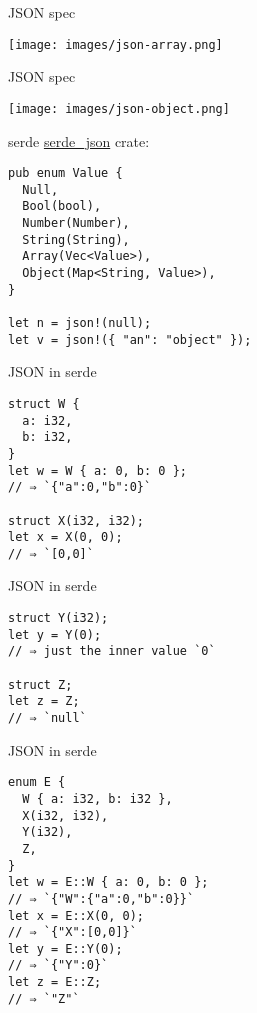 \documentclass{beamer}
\begin{document}
\begin{frame}[fragile]{JSON spec}
  \begin{center}
    \texttt{[image: images/json-array.png]}
  \end{center}
\end{frame}

\begin{frame}[fragile]{JSON spec}
  \begin{center}
    \texttt{[image: images/json-object.png]}
  \end{center}
\end{frame}

\begin{frame}[fragile]{serde}
  \href{https://github.com/serde-rs/json}{serde\_json} crate:
  \begin{verbatim}
pub enum Value {
  Null,
  Bool(bool),
  Number(Number),
  String(String),
  Array(Vec<Value>),
  Object(Map<String, Value>),
}

let n = json!(null);
let v = json!({ "an": "object" });
  \end{verbatim}
\end{frame}


\begin{frame}[fragile]{JSON in serde}
  \begin{verbatim}
struct W {
  a: i32,
  b: i32,
}
let w = W { a: 0, b: 0 };
// ⇒ `{"a":0,"b":0}`

struct X(i32, i32);
let x = X(0, 0);
// ⇒ `[0,0]`
  \end{verbatim}
\end{frame}

\begin{frame}[fragile]{JSON in serde}
  \begin{verbatim}
struct Y(i32);
let y = Y(0);
// ⇒ just the inner value `0`

struct Z;
let z = Z;
// ⇒ `null`
  \end{verbatim}
\end{frame}

\begin{frame}[fragile]{JSON in serde}
  \begin{verbatim}
enum E {
  W { a: i32, b: i32 },
  X(i32, i32),
  Y(i32),
  Z,
}
let w = E::W { a: 0, b: 0 };
// ⇒ `{"W":{"a":0,"b":0}}`
let x = E::X(0, 0);
// ⇒ `{"X":[0,0]}`
let y = E::Y(0);
// ⇒ `{"Y":0}`
let z = E::Z;
// ⇒ `"Z"`
  \end{verbatim}
\end{frame}
\end{document}
